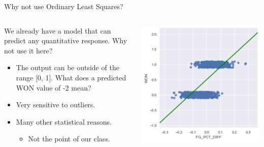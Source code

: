 \documentclass[aspectratio=169]{../latex_main/tntbeamer}  %
\begin{document}
	
	\begin{frame}{Why not use Ordinary Least Squares?}
	    \begin{columns}
	        \begin{column}{.4\textwidth}
	                We already have a model that can predict any quantitative response. Why not use it here?
	                \begin{itemize}
	                    \item The output can be outside of the range [0, 1]. What does a predicted WON value of -2 mean?
	                    \item Very sensitive to outliers.
	                    \item Many other statistical reasons.
	                    \begin{itemize}
	                        \item Not the point of our class.
	                    \end{itemize}
	                \end{itemize}
	        \end{column}
	        
	        \begin{column}{.4\textwidth}

	                    \includegraphics[scale=.5]{Bild4}
	        \end{column}
	    \end{columns}
	\end{frame}
	
\end{document}
